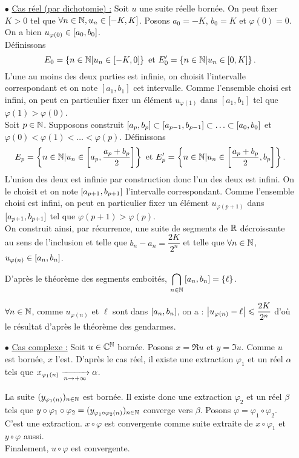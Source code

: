 \documentclass{magnolia}
\begin{document}
\begin{preuve}
\begin{itemize}
\item[$\bullet$] \underline{Cas réel (par dichotomie) :} Soit $u$ une suite réelle bornée. On peut fixer $K>0$ tel que $\forall n\in \mathbb{N}, u_n\in \left[-K,K\right]$. Posons $a_0=-K$, $b_0=K$ et $\varphi(0)=0$. On a bien $u_{\varphi(0)}\in \left[a_0,b_0\right]$.\\
Définissons \[E_0=\left\{n\in\mathbb{N} | u_n \in \left[-K,0\right]\right\} \text{ et } E'_0=\left\{n\in\mathbb{N} | u_n \in \left[0,K\right]\right\}.\] L'une au moins des deux parties est infinie, on choisit l'intervalle correspondant et on note $[a_1,b_1]$ cet intervalle. Comme l'ensemble choisi est infini, on peut en particulier fixer un élément $u_{\varphi(1)}$ dans $[a_1,b_1]$ tel que $\varphi(1)>\varphi(0)$.\\
Soit $p\in \mathbb{N}$. Supposons construit $\left[a_p,b_p\right] \subset\left[a_{p-1},b_{p-1}\right]\subset\ldots\subset\left[a_0,b_0\right]$ et $\varphi(0)<\varphi(1)<\ldots<\varphi(p)$. Définissons \[E_p=\left\{n\in\mathbb{N} | u_n \in \left[a_p,\frac{a_p+b_p}{2}\right]\right\} \text{ et } E'_p=\left\{n\in\mathbb{N} | u_n \in \left[\frac{a_p+b_p}{2},b_p\right]\right\}.\]
L'union des deux est infinie par construction donc l'un des deux est infini. On le choisit et on note $\left[a_{p+1},b_{p+1}\right]$ l'intervalle correspondant. Comme l'ensemble choisi est infini, on peut en particulier fixer un élément $u_{\varphi(p+1)}$ dans $\left[a_{p+1},b_{p+1}\right]$ tel que $\varphi(p+1)>\varphi(p)$.\\

On construit ainsi, par récurrence, une suite de segments de $\mathbb{R}$ décroissante au sens de l'inclusion et telle que $b_n-a_n=\dfrac{2K}{2^n}$ et telle que $\forall n\in \mathbb{N}$, $u_{\varphi(n)}\in \left[a_n,b_n\right]$.

D'après le théorème des segments emboités, $\displaystyle \bigcap_{n\in \mathbb{N}}\left[a_n,b_n\right]=\left\{\ell\right\}$.

$\forall n\in \mathbb{N}$, comme $u_{\varphi(n)}$ et $\ell$ sont dans $\left[a_n,b_n\right]$, on a : $\left|u_{\varphi(n)}-\ell\right|\leqslant \dfrac{2K}{2^n}$ d'où le résultat d'après le théorème des gendarmes.
\item[$\bullet$] \underline{Cas complexe :} Soit $u\in\mathbb{C}^{\mathbb{N}}$ bornée. Posons $x=\Re u$ et $y=\Im u$. Comme $u$ est bornée, $x$ l'est. D'après le cas réel, il existe une extraction $\varphi_1$ et un réel $\alpha$ tels que $x_{\varphi_1(n)}\xrightarrow[n\rightarrow +\infty]{}\alpha$.

La suite $(y_{\varphi_1(n)})_{n\in\mathbb{N}}$ est bornée. Il existe donc une extraction $\varphi_2$ et un réel $\beta$ tels que $y\circ \varphi_1 \circ \varphi_2=(y_{\varphi_1\circ\varphi_2(n)})_{n\in\mathbb{N}}$ converge vers $\beta$.
Posons $\varphi=\varphi_1\circ\varphi_2$. C'est une extraction. $x\circ\varphi$ est convergente comme suite extraite de $x\circ\varphi_1$ et $y\circ\varphi$ aussi.\\

Finalement, $u\circ \varphi$ est convergente.
\end{itemize}
\end{preuve}
\end{document}
